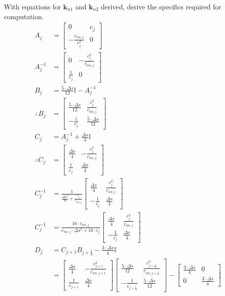 \documentclass{article}
\begin{document}
With equations for $\bm{k}_{n1}$ and $\bm{k}_{n2}$ derived, derive the specifics required for computation.
\begin{align*}
  A_j &= \begin{bmatrix} 0 & c_j \\ -\frac{c_{nn, j}}{c_j^2} & 0 \end{bmatrix}  \\
  A_j^{-1} &= \begin{bmatrix} 0 & -\frac{c_j^2}{c_{nn, j}} \\ \frac{1}{c_j} & 0 \end{bmatrix}  \\
  B_j &= \frac{5\cdot\Delta s}{12}\mathbb{I} - A_{j}^{-1}\\
  \therefore B_{j}&= \begin{bmatrix} \frac{5\cdot \Delta s}{12} & \frac{c_j^2}{c_{nn, j}} \\ -\frac{1}{c_j} & \frac{5\cdot\Delta s}{12} \end{bmatrix}\\
  C_j &= A_{j}^{-1} + \frac{\Delta s}{4}\mathbb{I}\\
  \therefore C_j &= \begin{bmatrix} \frac{\Delta s}{4} & -\frac{c_j^2}{c_{nn, j}} \\ \frac{1}{c_j} & \frac{\Delta s}{4} \end{bmatrix}\\
  C_j^{-1} &= \frac{1}{\frac{\Delta s^2}{16} + \frac{c_j}{c_{nn, j}}}\begin{bmatrix} \frac{\Delta s}{4} & \frac{c_j^2}{c_{nn, j}} \\ -\frac{1}{c_j} & \frac{\Delta s}{4} \end{bmatrix} \\
  C_j^{-1} &= \frac{16\cdot c_{nn, j}}{c_{nn, j}\cdot \Delta s^2 + 16\cdot c_j}\begin{bmatrix} \frac{\Delta s}{4} & \frac{c_j^2}{c_{nn, j}} \\ -\frac{1}{c_j} & \frac{\Delta s}{4} \end{bmatrix} \\
  D_j &= C_{j+1}B_{j+\frac{1}{3}} - \frac{3\cdot\Delta s}{4}\mathbb{I}\\
      &= \begin{bmatrix} \frac{\Delta s}{4} & -\frac{c_{j+1}^2}{c_{nn, j+1}} \\ \frac{1}{c_{j+1}} & \frac{\Delta s}{4} \end{bmatrix}\begin{bmatrix} \frac{5\cdot \Delta s}{12} & \frac{c_{j+\frac{1}{3}}^2}{c_{nn, j+\frac{1}{3}}} \\ -\frac{1}{c_{j+\frac{1}{3}}} & \frac{5\cdot\Delta s}{12} \end{bmatrix} - \begin{bmatrix} \frac{3\cdot\Delta s}{4} & 0 \\ 0 & \frac{3\cdot\Delta s}{4} \end{bmatrix}\\

\end{align*}
\end{document}
